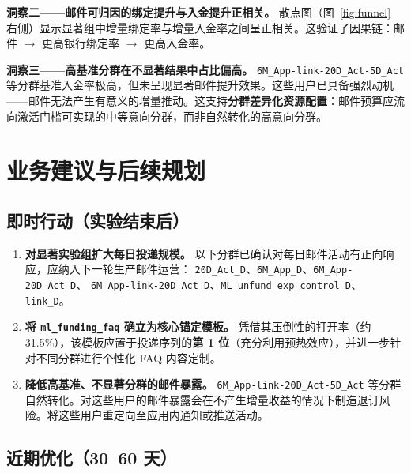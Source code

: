 \documentclass[12pt,a4paper]{ctexart}
\begin{document}
\textbf{洞察二——邮件可归因的绑定提升与入金提升正相关。}
散点图（图~\ref{fig:funnel} 右侧）显示显著组中增量绑定率与增量入金率之间呈正相关。这验证了因果链：邮件 $\to$ 更高银行绑定率 $\to$ 更高入金率。

\textbf{洞察三——高基准分群在不显著结果中占比偏高。}
\texttt{6M\_App-link-20D\_Act-5D\_Act} 等分群基准入金率极高，但未呈现显著邮件提升效果。这些用户已具备强烈动机——邮件无法产生有意义的增量推动。这支持\textbf{分群差异化资源配置}：邮件预算应流向激活门槛可实现的中等意向分群，而非自然转化的高意向分群。

\clearpage
\section{业务建议与后续规划}

\subsection{即时行动（实验结束后）}

\begin{enumerate}[leftmargin=2em, label=\textbf{\arabic*.}]

  \item \textbf{对显著实验组扩大每日投递规模。}
    以下分群已确认对每日邮件活动有正向响应，应纳入下一轮生产邮件运营：
    \texttt{20D\_Act\_D}、\texttt{6M\_App\_D}、\texttt{6M\_App-20D\_Act\_D}、
    \texttt{6M\_App-link-20D\_Act\_D}、\texttt{ML\_unfund\_exp\_control\_D}、
    \texttt{link\_D}。

  \item \textbf{将 \texttt{ml\_funding\_faq} 确立为核心锚定模板。}
    凭借其压倒性的打开率（约 31.5\%），该模板应置于投递序列的\textbf{第 1 位}（充分利用预热效应），并进一步针对不同分群进行个性化 FAQ 内容定制。

  \item \textbf{降低高基准、不显著分群的邮件暴露。}
    \texttt{6M\_App-link-20D\_Act-5D\_Act} 等分群自然转化。对这些用户的邮件暴露会在不产生增量收益的情况下制造退订风险。将这些用户重定向至应用内通知或推送活动。

\end{enumerate}

\subsection{近期优化（30--60 天）}
\end{document}
